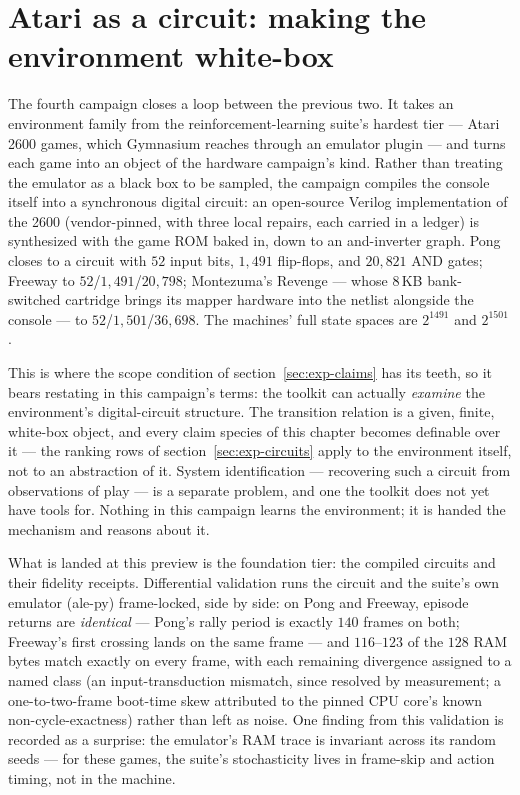 \section{Atari as a circuit: making the environment white-box}
\label{sec:exp-atari}

The fourth campaign closes a loop between the previous two. It takes
an environment family from the reinforcement-learning suite's hardest
tier --- Atari 2600 games, which Gymnasium reaches through an
emulator plugin --- and turns each game into an object of the
hardware campaign's kind. Rather than treating the emulator as a
black box to be sampled, the campaign compiles the console itself
into a synchronous digital circuit: an open-source Verilog
implementation of the 2600 (vendor-pinned, with three local repairs,
each carried in a ledger) is synthesized with the game ROM baked in,
down to an and-inverter graph. Pong closes to a circuit with $52$
input bits, $1{,}491$ flip-flops, and $20{,}821$ AND gates; Freeway
to $52$/$1{,}491$/$20{,}798$; Montezuma's Revenge --- whose
$8$\,KB bank-switched cartridge brings its mapper hardware into the
netlist alongside the console --- to $52$/$1{,}501$/$36{,}698$. The
machines' full state spaces are $2^{1491}$ and $2^{1501}$.

This is where the scope condition of section~\ref{sec:exp-claims} has
its teeth, so it bears restating in this campaign's terms: the
toolkit can actually \emph{examine} the environment's digital-circuit
structure. The transition relation is a given, finite, white-box
object, and every claim species of this chapter becomes definable
over it --- the ranking rows of section~\ref{sec:exp-circuits} apply
to the environment itself, not to an abstraction of it. System
identification --- recovering such a circuit from observations of
play --- is a separate problem, and one the toolkit does not yet have
tools for. Nothing in this campaign learns the environment; it is
handed the mechanism and reasons about it.

What is landed at this preview is the foundation tier: the compiled
circuits and their fidelity receipts. Differential validation runs
the circuit and the suite's own emulator (ale-py) frame-locked, side
by side: on Pong and Freeway, episode returns are \emph{identical} --- Pong's
rally period is exactly $140$ frames on both; Freeway's first
crossing lands on the same frame --- and $116$--$123$ of the $128$
RAM bytes match exactly on every frame, with each remaining
divergence assigned to a named class (an input-transduction mismatch,
since resolved by measurement; a one-to-two-frame boot-time skew
attributed to the pinned CPU core's known non-cycle-exactness)
rather than left as noise. One finding from this validation is
recorded as a surprise: the emulator's RAM trace is invariant across
its random seeds --- for these games, the suite's stochasticity lives
in frame-skip and action timing, not in the machine.

